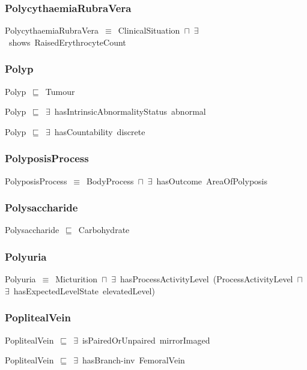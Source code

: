 \documentclass{article}
\begin{document}
\subsubsection*{PolycythaemiaRubraVera}

PolycythaemiaRubraVera~\ensuremath{\equiv}~ClinicalSituation~\ensuremath{\sqcap}~\ensuremath{\exists}~shows~RaisedErythrocyteCount

\subsubsection*{Polyp}

Polyp~\ensuremath{\sqsubseteq}~Tumour~

Polyp~\ensuremath{\sqsubseteq}~\ensuremath{\exists}~hasIntrinsicAbnormalityStatus~abnormal~

Polyp~\ensuremath{\sqsubseteq}~\ensuremath{\exists}~hasCountability~discrete~

\subsubsection*{PolyposisProcess}

PolyposisProcess~\ensuremath{\equiv}~BodyProcess~\ensuremath{\sqcap}~\ensuremath{\exists}~hasOutcome~AreaOfPolyposis

\subsubsection*{Polysaccharide}

Polysaccharide~\ensuremath{\sqsubseteq}~Carbohydrate~

\subsubsection*{Polyuria}

Polyuria~\ensuremath{\equiv}~Micturition~\ensuremath{\sqcap}~\ensuremath{\exists}~hasProcessActivityLevel~(ProcessActivityLevel~\ensuremath{\sqcap}~\ensuremath{\exists}~hasExpectedLevelState~elevatedLevel)

\subsubsection*{PoplitealVein}

PoplitealVein~\ensuremath{\sqsubseteq}~\ensuremath{\exists}~isPairedOrUnpaired~mirrorImaged~

PoplitealVein~\ensuremath{\sqsubseteq}~\ensuremath{\exists}~hasBranch-inv~FemoralVein~
\end{document}
